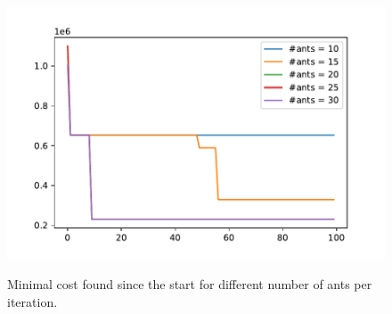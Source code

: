 \begin{figure}[h]
	\begin{centering}
		{\includegraphics[scale=0.7]{figures/experiments/plt_ant.pdf}}
		\caption{Minimal cost found since the start for different number of ants per iteration.}
		\label{fig:plt_ant}
	\end{centering}
\end{figure}
